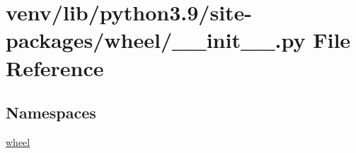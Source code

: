 \hypertarget{venv_2lib_2python3_89_2site-packages_2wheel_2____init_____8py}{}\section{venv/lib/python3.9/site-\/packages/wheel/\+\_\+\+\_\+init\+\_\+\+\_\+.py File Reference}
\label{venv_2lib_2python3_89_2site-packages_2wheel_2____init_____8py}
\subsection*{Namespaces}
\begin{DoxyCompactItemize}
\item 
 \hyperlink{namespacewheel}{wheel}
\end{DoxyCompactItemize}
